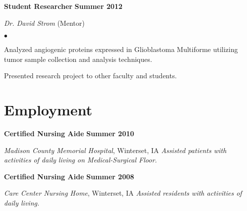 \documentclass[10pt,letterpaper]{article}
\renewenvironment{itemize}{
  \begin{list}{}{
      \setlength{\leftmargin}{1.5em}
      \setlength{\itemsep}{0.25em}
      \setlength{\parskip}{0pt}
      \setlength{\parsep}{0.25em}
    }
  }{
  \end{list}
}
\newenvironment{bitemize}{
  \begin{list}{$\bullet$}{
      \setlength{\leftmargin}{1.5em}
      \setlength{\itemsep}{0.25em}
      \setlength{\parskip}{0pt}
      \setlength{\parsep}{0.25em}
    }
  }{
  \end{list}
}
\newcommand{\yearrange}[1]{\hfill \textbf{#1} \par}
\begin{document}
\begin{itemize}
\item \textbf{Student Researcher} \yearrange{Summer 2012}
  \textit{Dr. David Strom} (Mentor)
  \begin{bitemize}
  \item Analyzed angiogenic proteins expressed in Glioblastoma
    Multiforme utilizing tumor sample collection and analysis
    techniques. 
  \item Presented research project to other faculty and students.
  \end{bitemize}
\end{itemize}

\section*{Employment}

\begin{itemize}
\item \textbf{Certified Nursing Aide} \yearrange{Summer 2010}
  \textit{Madison County Memorial Hospital}, Winterset, IA
  \textit{Assisted patients with activities of daily living on Medical-Surgical Floor.}
\item \textbf{Certified Nursing Aide} \yearrange{Summer 2008}
  \textit{Care Center Nursing Home}, Winterset, IA
  \textit{Assisted residents with activities of daily living.}
\end{itemize}
\end{document}

